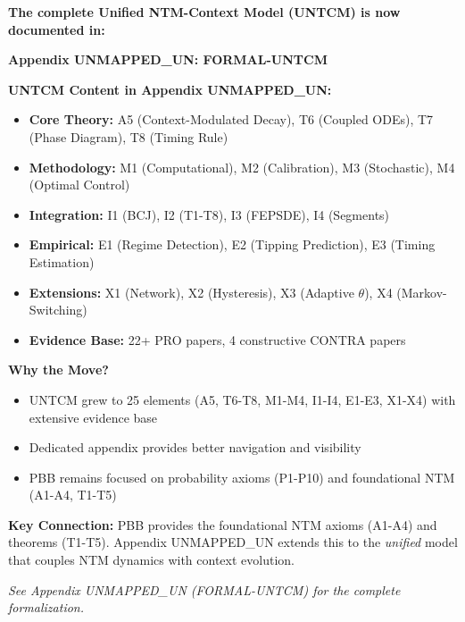 \documentclass[11pt, a4paper]{article}
\begin{document}
\begin{tcolorbox}[colback=orange!5!white, colframe=orange!75!black,
    title=\textbf{Cross-Reference: UNTCM moved to Appendix UNMAPPED_UN}]

\textbf{The complete Unified NTM-Context Model (UNTCM) is now documented in:}

\begin{center}
\Large\textbf{Appendix UNMAPPED_UN: FORMAL-UNTCM}
\end{center}

\textbf{UNTCM Content in Appendix UNMAPPED_UN:}
\begin{itemize}[nosep]
    \item \textbf{Core Theory:} A5 (Context-Modulated Decay), T6 (Coupled ODEs), T7 (Phase Diagram), T8 (Timing Rule)
    \item \textbf{Methodology:} M1 (Computational), M2 (Calibration), M3 (Stochastic), M4 (Optimal Control)
    \item \textbf{Integration:} I1 (BCJ), I2 (T1-T8), I3 (FEPSDE), I4 (Segments)
    \item \textbf{Empirical:} E1 (Regime Detection), E2 (Tipping Prediction), E3 (Timing Estimation)
    \item \textbf{Extensions:} X1 (Network), X2 (Hysteresis), X3 (Adaptive $\theta$), X4 (Markov-Switching)
    \item \textbf{Evidence Base:} 22+ PRO papers, 4 constructive CONTRA papers
\end{itemize}

\textbf{Why the Move?}
\begin{itemize}[nosep]
    \item UNTCM grew to 25 elements (A5, T6-T8, M1-M4, I1-I4, E1-E3, X1-X4) with extensive evidence base
    \item Dedicated appendix provides better navigation and visibility
    \item PBB remains focused on probability axioms (P1-P10) and foundational NTM (A1-A4, T1-T5)
\end{itemize}

\textbf{Key Connection:} PBB provides the foundational NTM axioms (A1-A4) and theorems (T1-T5). Appendix UNMAPPED_UN extends this to the \emph{unified} model that couples NTM dynamics with context evolution.

\vspace{0.5em}
\textit{See Appendix UNMAPPED_UN (FORMAL-UNTCM) for the complete formalization.}

\end{tcolorbox}
\end{document}
